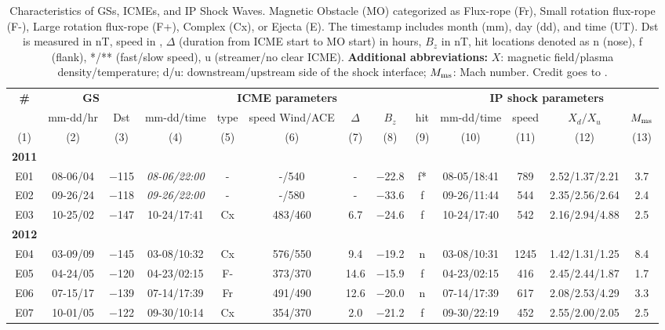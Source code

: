 \begin{landscape}
	\footnotesize
	\begin{longtable}{ccccccccccccc}
		\caption{Characteristics of GSs, ICMEs, and IP Shock Waves. Magnetic Obstacle (MO) categorized as Flux-rope (Fr), Small rotation flux-rope (F-), Large rotation flux-rope (F+), Complex (Cx), or Ejecta (E). The timestamp includes month (mm), day (dd), and time (UT). Dst is measured in nT, speed in \kms, $\Delta$ (duration from ICME start to MO start) in hours, $B_z$ in nT, hit locations denoted as n (nose), f (flank), */** (fast/slow speed), u (streamer/no clear ICME). {\bf Additional abbreviations:} $X$: magnetic field/plasma density/temperature; d/u: downstream/upstream side of the shock interface; $M_{\rm ms}$: Mach number. Credit goes to \citet{miteva_2023}.}
		\label{tab_GS_IP}\\
			\toprule
			\textbf{\#}	& \multicolumn{2}{c}{\textbf{GS}} & \multicolumn{6}{c}{\textbf{ICME parameters}} & \multicolumn{4}{c}{\textbf{IP shock parameters}} \\
			& mm-dd/hr & Dst & mm-dd/time & type & speed Wind/ACE & $\Delta$ & $B_z$ & hit & mm-dd/time & speed & $X_d/X_u$ & $M_{\rm ms}$ \\
			(1) & (2) & (3) & (4) & (5) & (6) & (7) & (8) & (9) & (10) & (11) & (12) & (13)\\
			\midrule
			\textbf{2011}\\
			E01	& 08-06/04 & $-$115 & {\it 08-06/22:00} & - & -/540 & - & $-$22.8 & f* & 08-05/18:41 & 789 & 2.52/1.37/2.21 & 3.7 \\
			E02	& 09-26/24 & $-$118 & {\it 09-26/22:00} & - & -/580 & - & $-$33.6 &  f & 09-26/11:44 & 544 & 2.35/2.56/2.64 & 2.4 \\
			E03	& 10-25/02 & $-$147 & 10-24/17:41 & Cx & 483/460 & 6.7 & $-$24.6 &  f & 10-24/17:40	& 542 & 2.16/2.94/4.88 & 2.5 \\
			\textbf{2012} \\
			E04 & 03-09/09 & $-$145 & 03-08/10:32 & Cx & 576/550 & 9.4 & $-$19.2 &  n & 03-08/10:31 & 1245 & 1.42/1.31/1.25 & 8.4 \\
			E05 & 04-24/05 & $-$120 & 04-23/02:15 & F- & 373/370 &  14.6 & $-$15.9 &  f & 04-23/02:15 & 416 & 2.45/2.44/1.87 & 1.7 \\
			E06 & 07-15/17 & $-$139 & 07-14/17:39 & Fr & 491/490 & 12.6 & $-$20.0 &  n & 07-14/17:39 & 617 & 2.08/2.53/4.29 & 3.3	\\
			E07	& 10-01/05 & $-$122 & 09-30/10:14 & Cx & 354/370 & 2.0 & $-$21.2 &  f & 09-30/22:19	& 452 & 2.55/2.00/2.05 & 2.5 \\ 

\end{longtable}
\end{landscape}
